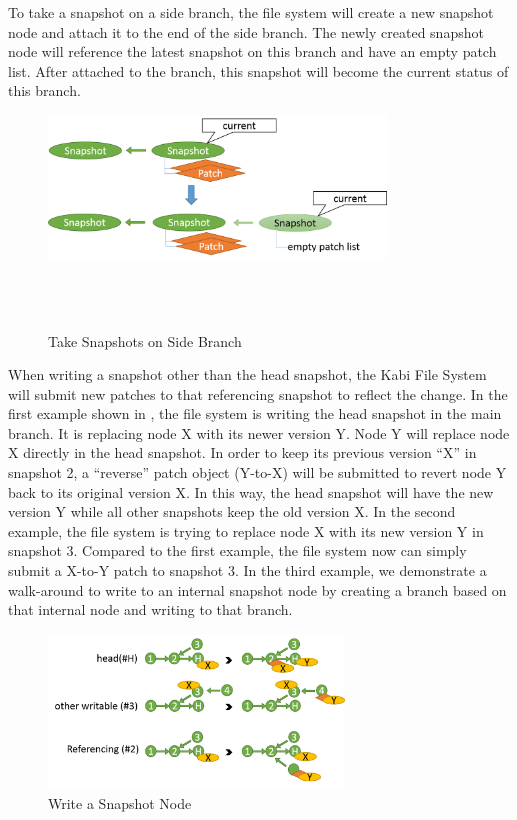 	To take a snapshot on a side branch, the file system will create a new snapshot node and attach it to the end of the side branch. The newly created snapshot node will reference the latest snapshot on this branch and have an empty patch list. After attached to the branch, this snapshot will become the current status of this branch.

\begin{figure}[t]
\centering
\includegraphics[width=0.8\textwidth]{Chapter-4/figs/fig21.png}
\caption{Take Snapshots on Side Branch}
~\\
~\\
\label{fig:take_snapshot_nonroot}
\end{figure}
    
    When writing a snapshot other than the head snapshot, the Kabi File System will submit new patches to that referencing snapshot to reflect the change. In the first example shown in , the file system is writing the head snapshot in the main branch. It is replacing node X with its newer version Y. Node Y will replace node X directly in the head snapshot. In order to keep its previous version ``X'' in snapshot 2, a ``reverse'' patch object (Y-to-X) will be submitted to revert node Y back to its original version X. In this way, the head snapshot will have the new version Y while all other snapshots keep the old version X. In the second example, the file system is trying to replace node X with its new version Y in snapshot 3. Compared to the first example, the file system now can simply submit a X-to-Y patch to snapshot 3. In the third example, we demonstrate a walk-around to write to an internal snapshot node by creating a branch based on that internal node and writing to that branch.

\begin{figure}[t]
\centering
\includegraphics[width=0.7\textwidth]{Chapter-4/figs/fig17.png}
\caption{Write a Snapshot Node}
\label{fig:write_snapshot_node}
\end{figure}

